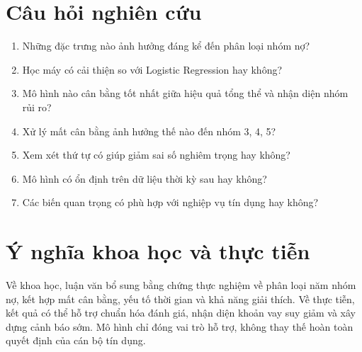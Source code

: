 \section{Câu hỏi nghiên cứu}

\begin{enumerate}
    \item Những đặc trưng nào ảnh hưởng đáng kể đến phân loại nhóm nợ?
    \item Học máy có cải thiện so với Logistic Regression hay không?
    \item Mô hình nào cân bằng tốt nhất giữa hiệu quả tổng thể và nhận diện nhóm rủi ro?
    \item Xử lý mất cân bằng ảnh hưởng thế nào đến nhóm 3, 4, 5?
    \item Xem xét thứ tự có giúp giảm sai số nghiêm trọng hay không?
    \item Mô hình có ổn định trên dữ liệu thời kỳ sau hay không?
    \item Các biến quan trọng có phù hợp với nghiệp vụ tín dụng hay không?
\end{enumerate}

\section{Ý nghĩa khoa học và thực tiễn}

Về khoa học, luận văn bổ sung bằng chứng thực nghiệm về phân loại năm nhóm nợ, kết hợp mất cân bằng, yếu tố thời gian và khả năng giải thích. Về thực tiễn, kết quả có thể hỗ trợ chuẩn hóa đánh giá, nhận diện khoản vay suy giảm và xây dựng cảnh báo sớm. Mô hình chỉ đóng vai trò hỗ trợ, không thay thế hoàn toàn quyết định của cán bộ tín dụng.
